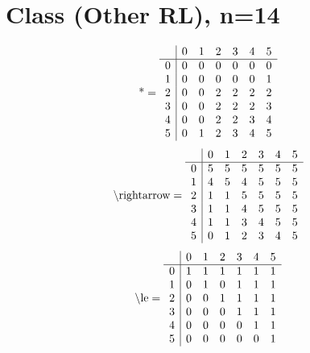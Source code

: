 \documentclass[11pt]{article}
\begin{document}
\section{Class (Other RL), n=14}
\[\text{*} = 
\begin{array}{r | r r r r r r}
 & 0 & 1 & 2 & 3 & 4 & 5 \\ \hline
0 & 0 & 0 & 0 & 0 & 0 & 0 \\
1 & 0 & 0 & 0 & 0 & 0 & 1 \\
2 & 0 & 0 & 2 & 2 & 2 & 2 \\
3 & 0 & 0 & 2 & 2 & 2 & 3 \\
4 & 0 & 0 & 2 & 2 & 3 & 4 \\
5 & 0 & 1 & 2 & 3 & 4 & 5 \\
\end{array}
\]
\[\text{\textbackslash rightarrow} = 
\begin{array}{r | r r r r r r}
 & 0 & 1 & 2 & 3 & 4 & 5 \\ \hline
0 & 5 & 5 & 5 & 5 & 5 & 5 \\
1 & 4 & 5 & 4 & 5 & 5 & 5 \\
2 & 1 & 1 & 5 & 5 & 5 & 5 \\
3 & 1 & 1 & 4 & 5 & 5 & 5 \\
4 & 1 & 1 & 3 & 4 & 5 & 5 \\
5 & 0 & 1 & 2 & 3 & 4 & 5 \\
\end{array}
\]
\[\text{\textbackslash le} = 
\begin{array}{r | r r r r r r}
 & 0 & 1 & 2 & 3 & 4 & 5 \\ \hline
0 & 1 & 1 & 1 & 1 & 1 & 1 \\
1 & 0 & 1 & 0 & 1 & 1 & 1 \\
2 & 0 & 0 & 1 & 1 & 1 & 1 \\
3 & 0 & 0 & 0 & 1 & 1 & 1 \\
4 & 0 & 0 & 0 & 0 & 1 & 1 \\
5 & 0 & 0 & 0 & 0 & 0 & 1 \\
\end{array}
\]
\end{document}
